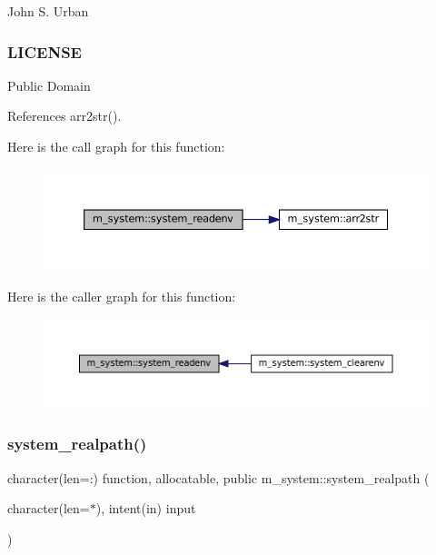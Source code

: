 John S. Urban \subsubsection*{L\+I\+C\+E\+N\+SE}

Public Domain 

References arr2str().

Here is the call graph for this function\+:
\nopagebreak
\begin{figure}[H]
\begin{center}
\leavevmode
\includegraphics[width=350pt]{namespacem__system_ae0e43010a82a6a25402568ccb326322d_cgraph}
\end{center}
\end{figure}
Here is the caller graph for this function\+:
\nopagebreak
\begin{figure}[H]
\begin{center}
\leavevmode
\includegraphics[width=350pt]{namespacem__system_ae0e43010a82a6a25402568ccb326322d_icgraph}
\end{center}
\end{figure}
\mbox{\label{namespacem__system_a70bbfa0a0be084b9717cbc04408041fc}} 
\subsubsection{\texorpdfstring{system\+\_\+realpath()}{system\_realpath()}}
{\footnotesize\ttfamily character(len=\+:) function, allocatable, public m\+\_\+system\+::system\+\_\+realpath (\begin{DoxyParamCaption}\item[{character(len=$\ast$), intent(in)}]{input }\end{DoxyParamCaption})}




